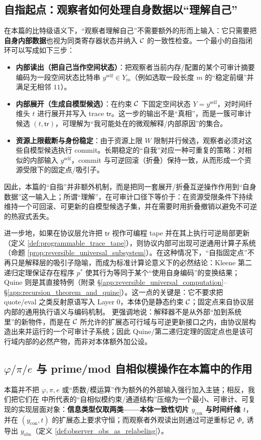 \subsection{自指起点：观察者如何处理自身数据以“理解自己”}
在本篇的比特级语义下，“观察者理解自己”不需要额外的形而上输入：它只需要把\textbf{自身内部数据}也视为同类寄存器状态并纳入 \(\mathcal{C}\) 的一致性检查。一个最小的自指闭环可以写成如下三步：
\begin{itemize}
  \item \textbf{内部读出（把自己当作空间状态）}：把观察者当前内存/配置的某个可审计摘要编码为一段空间状态比特串 \(y^{\mathrm{self}}\in Y_m\)（例如选取一段长度 \(m\) 的“稳定前缀”并满足无相邻 \(11\)）。
  \item \textbf{内部展开（生成自模型候选）}：在约束 \(\mathcal{C}\) 下固定空间状态 \(Y=y^{\mathrm{self}}\)，对时间纤维头 \(t\) 进行展开并写入 trace \(\mathsf{tr}\)。这一步的输出不是“真相”，而是一簇可审计候选 \((t,\mathsf{tr})\)，可理解为“我可能处在的微观解释/内部原因”的集合。
  \item \textbf{资源上限截断与身份稳定}：由于资源上限 \(W\) 限制并行候选，观察者必须对这些自模型候选执行 commit。长期稳定的“自我”对应一种可重复的策略：对相似的内部输入 \(y^{\mathrm{self}}\)，commit 与可逆回滚（折叠）保持一致，从而形成一个资源受限下的固定点/吸引子。
\end{itemize}
因此，本篇的“自指”并非额外机制，而是把同一套展开/折叠互逆操作作用到“自身数据”这一输入上；所谓“理解”，在可审计口径下等价于：在资源受限条件下持续维持一个可回滚、可更新的自模型候选子集，并在需要时用折叠撤销以避免不可逆的热寂式丢失。

进一步地，如果在协议层允许把 \(\mathsf{tr}\) 视作可编程 tape 并在其上执行可逆局部更新（定义 \ref{def:programmable_trace_tape}），则协议内部可出现可逆通用计算子系统（命题 \ref{prop:reversible_universal_subsystem}）。在这种情况下，“自指固定点”不再只是解释层的吸引子隐喻，而成为标准计算论意义下的必然结论：Kleene 第二递归定理保证存在程序 \(p^\ast\) 使其行为等同于某个“使用自身编码”的变换结果；Quine 则是其直接特例（附录 \S\ref{app:reversible_universal_computation}--\S\ref{app:recursion_theorem_and_quine}）。这一点的关键是：它不要求把 quote/eval 之类反射原语写入 Layer 0，本体仍是静态约束 \(\mathcal{C}\)；固定点来自协议层内部的通用执行语义与编码机制。
更强调地说：解释器不是从外部“加到系统里”的新物件，而是在 \(\mathcal{C}\) 所允许的扩展态可行域与可逆更新接口之内，由协议层构造出来并运行的一个可审计子系统；因此 Quine/第二递归定理的固定点也是该可行域内部的必然产物，而非对本体额外加公设。

\subsection{\texorpdfstring{$\varphi/\pi/e$}{phi/pi/e} 与 prime/mod 自相似模操作在本篇中的作用}
本篇并不把 \(\varphi,\pi,e\) 或“质数/模运算”作为额外的外部输入强行加入主链；相反，我们把它们在  中所代表的“自相似模约束/通道结构”压缩为一个最小、可审计、可复现的实现层面对象：\textbf{信息类型仅取两类——本体一致性切片 \(y_{\mathrm{con}}\) 与时间纤维 \(t\)}，并在 \((y_{\mathrm{con}},t)\) 的扩展态上要求守恒；而观察者外观读出则通过可逆重标记 \(\Phi_s\) 诱导出 \(y_{\mathrm{obs}}\)（定义 \ref{def:observer_obs_as_relabeling}）。

